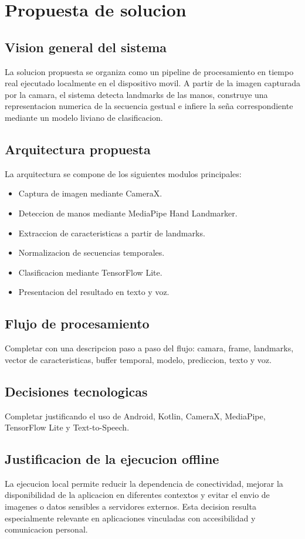 \chapter{Propuesta de solucion}

\section{Vision general del sistema}

La solucion propuesta se organiza como un pipeline de procesamiento en tiempo real ejecutado localmente en el dispositivo movil. A partir de la imagen capturada por la camara, el sistema detecta landmarks de las manos, construye una representacion numerica de la secuencia gestual e infiere la seña correspondiente mediante un modelo liviano de clasificacion.

\section{Arquitectura propuesta}

La arquitectura se compone de los siguientes modulos principales:

\begin{itemize}
    \item Captura de imagen mediante CameraX.
    \item Deteccion de manos mediante MediaPipe Hand Landmarker.
    \item Extraccion de caracteristicas a partir de landmarks.
    \item Normalizacion de secuencias temporales.
    \item Clasificacion mediante TensorFlow Lite.
    \item Presentacion del resultado en texto y voz.
\end{itemize}

\section{Flujo de procesamiento}

Completar con una descripcion paso a paso del flujo: camara, frame, landmarks, vector de caracteristicas, buffer temporal, modelo, prediccion, texto y voz.

\section{Decisiones tecnologicas}

Completar justificando el uso de Android, Kotlin, CameraX, MediaPipe, TensorFlow Lite y Text-to-Speech.

\section{Justificacion de la ejecucion offline}

La ejecucion local permite reducir la dependencia de conectividad, mejorar la disponibilidad de la aplicacion en diferentes contextos y evitar el envio de imagenes o datos sensibles a servidores externos. Esta decision resulta especialmente relevante en aplicaciones vinculadas con accesibilidad y comunicacion personal.
